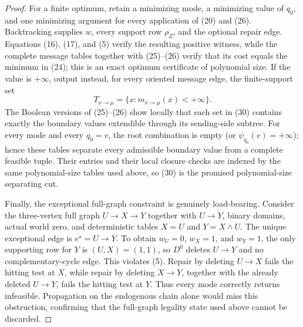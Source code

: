 \documentclass{article}
\begin{document}
\begin{proof}
For a finite optimum, retain a minimizing mode, a minimizing value of \(q_0\), and one minimizing argument for every application of (20) and (26).  Backtracking supplies \(w\), every support row \(\rho_Z\), and the optional repair edge.  Equations (16), (17), and (5) verify the resulting positive witness, while the complete message tables together with (25)--(26) verify that its cost equals the minimum in (24); this is an exact optimum certificate of polynomial size.  If the value is \(+\infty\), output instead, for every oriented message edge, the finite-support set
\[
 T_{\nu\to\mu}=\{x:m_{\nu\to\mu}(x)<+\infty\}.                    \tag{30}
\]
The Boolean versions of (25)--(26) show locally that each set in (30) contains exactly the boundary values extendible through its sending-side subtree.  For every mode and every \(q_0=v\), the root combination is empty (or \(\psi_{q_0}(v)=+\infty\)); hence these tables separate every admissible boundary value from a complete feasible tuple.  Their entries and their local closure checks are indexed by the same polynomial-size tables used above, so (30) is the promised polynomial-size separating cut.

Finally, the exceptional full-graph constraint is genuinely load-bearing.  Consider the three-vertex full graph \(U\to X\to Y\) together with \(U\to Y\), binary domains, actual world zero, and deterministic tables \(X=U\) and \(Y=X\wedge U\).  The unique exceptional edge is \(e^\star=U\to Y\).  To obtain \(w_U=0\), \(w_X=1\), and \(w_Y=1\), the only supporting row for \(Y\) is \((U,X)=(1,1)\), so \(D^0\) deletes \(U\to Y\) and no complementary-cycle edge.  This violates (5).  Repair by deleting \(U\to X\) fails the hitting test at \(X\), while repair by deleting \(X\to Y\), together with the already deleted \(U\to Y\), fails the hitting test at \(Y\).  Thus every mode correctly returns infeasible.  Propagation on the endogenous chain alone would miss this obstruction, confirming that the full-graph legality state used above cannot be discarded.
\end{proof}
\end{document}
